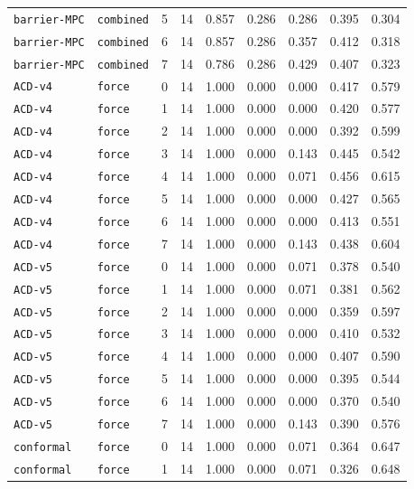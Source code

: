 \documentclass{article}
\begin{document}
\begin{center}
{\begin{tabular}{llllccccc}
\texttt{barrier-MPC} & \texttt{combined} & 5 & 14 & 0.857 & 0.286 & 0.286 & 0.395 & 0.304 \\
\texttt{barrier-MPC} & \texttt{combined} & 6 & 14 & 0.857 & 0.286 & 0.357 & 0.412 & 0.318 \\
\texttt{barrier-MPC} & \texttt{combined} & 7 & 14 & 0.786 & 0.286 & 0.429 & 0.407 & 0.323 \\
\texttt{ACD-v4} & \texttt{force} & 0 & 14 & 1.000 & 0.000 & 0.000 & 0.417 & 0.579 \\
\texttt{ACD-v4} & \texttt{force} & 1 & 14 & 1.000 & 0.000 & 0.000 & 0.420 & 0.577 \\
\texttt{ACD-v4} & \texttt{force} & 2 & 14 & 1.000 & 0.000 & 0.000 & 0.392 & 0.599 \\
\texttt{ACD-v4} & \texttt{force} & 3 & 14 & 1.000 & 0.000 & 0.143 & 0.445 & 0.542 \\
\texttt{ACD-v4} & \texttt{force} & 4 & 14 & 1.000 & 0.000 & 0.071 & 0.456 & 0.615 \\
\texttt{ACD-v4} & \texttt{force} & 5 & 14 & 1.000 & 0.000 & 0.000 & 0.427 & 0.565 \\
\texttt{ACD-v4} & \texttt{force} & 6 & 14 & 1.000 & 0.000 & 0.000 & 0.413 & 0.551 \\
\texttt{ACD-v4} & \texttt{force} & 7 & 14 & 1.000 & 0.000 & 0.143 & 0.438 & 0.604 \\
\texttt{ACD-v5} & \texttt{force} & 0 & 14 & 1.000 & 0.000 & 0.071 & 0.378 & 0.540 \\
\texttt{ACD-v5} & \texttt{force} & 1 & 14 & 1.000 & 0.000 & 0.071 & 0.381 & 0.562 \\
\texttt{ACD-v5} & \texttt{force} & 2 & 14 & 1.000 & 0.000 & 0.000 & 0.359 & 0.597 \\
\texttt{ACD-v5} & \texttt{force} & 3 & 14 & 1.000 & 0.000 & 0.000 & 0.410 & 0.532 \\
\texttt{ACD-v5} & \texttt{force} & 4 & 14 & 1.000 & 0.000 & 0.000 & 0.407 & 0.590 \\
\texttt{ACD-v5} & \texttt{force} & 5 & 14 & 1.000 & 0.000 & 0.000 & 0.395 & 0.544 \\
\texttt{ACD-v5} & \texttt{force} & 6 & 14 & 1.000 & 0.000 & 0.000 & 0.370 & 0.540 \\
\texttt{ACD-v5} & \texttt{force} & 7 & 14 & 1.000 & 0.000 & 0.143 & 0.390 & 0.576 \\
\texttt{conformal} & \texttt{force} & 0 & 14 & 1.000 & 0.000 & 0.071 & 0.364 & 0.647 \\
\texttt{conformal} & \texttt{force} & 1 & 14 & 1.000 & 0.000 & 0.071 & 0.326 & 0.648 \\
\bottomrule
\end{tabular}%
}
\end{center}
\end{document}
